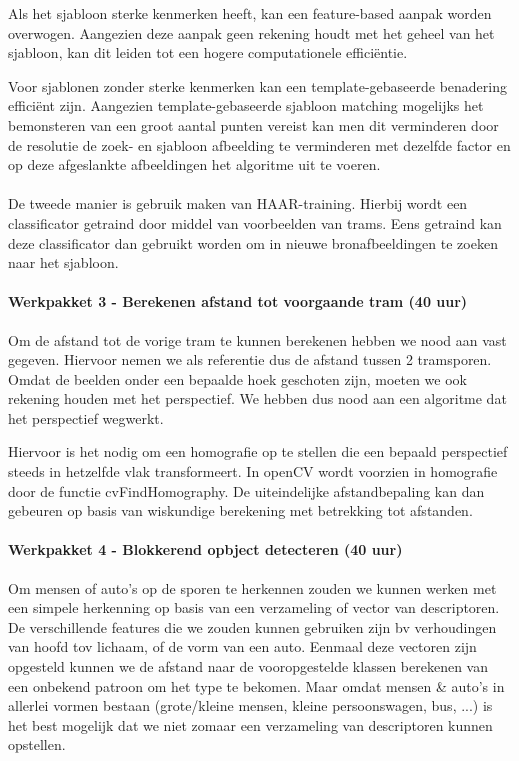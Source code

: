 \documentclass[]{book}
\begin{document}
Als het sjabloon sterke kenmerken heeft, kan een feature-based aanpak worden overwogen. Aangezien deze aanpak geen rekening houdt met het geheel van het sjabloon, kan dit leiden tot een hogere computationele efficiëntie.

Voor sjablonen zonder sterke kenmerken kan een template-gebaseerde benadering efficiënt zijn. Aangezien template-gebaseerde sjabloon matching mogelijks het bemonsteren van een groot aantal punten vereist kan men dit verminderen door de resolutie de zoek- en sjabloon afbeelding te verminderen met dezelfde factor en op deze afgeslankte afbeeldingen het algoritme uit te voeren.
\\\\
De tweede manier is gebruik maken van HAAR-training. Hierbij wordt een classificator getraind door middel van voorbeelden van trams. Eens getraind kan deze classificator dan gebruikt worden om in nieuwe bronafbeeldingen te zoeken naar het sjabloon.

\paragraph{Werkpakket 3 - Berekenen afstand tot voorgaande tram (40 uur)}

Om de afstand tot de vorige tram te kunnen berekenen hebben we nood aan vast gegeven. Hiervoor nemen we als referentie dus de afstand tussen 2 tramsporen. Omdat de beelden onder een bepaalde hoek geschoten zijn, moeten we ook rekening houden met het perspectief. We hebben dus nood aan een algoritme dat het perspectief wegwerkt.

Hiervoor is het nodig om een homografie op te stellen die een bepaald perspectief steeds in hetzelfde vlak transformeert. In openCV wordt voorzien in homografie door de functie cvFindHomography. De uiteindelijke afstandbepaling kan dan gebeuren op basis van wiskundige berekening met betrekking tot afstanden.

\paragraph{Werkpakket 4 - Blokkerend opbject detecteren (40 uur)}

Om mensen of auto's op de sporen te herkennen zouden we kunnen werken met een simpele herkenning op basis van een verzameling of vector van descriptoren. De verschillende features die we zouden kunnen gebruiken zijn bv verhoudingen van hoofd tov lichaam, of de vorm van een auto. Eenmaal deze vectoren zijn opgesteld kunnen we de afstand naar de vooropgestelde klassen berekenen van een onbekend patroon om het type te bekomen. Maar omdat mensen \& auto's in allerlei vormen bestaan (grote/kleine mensen, kleine persoonswagen, bus, ...) is het best mogelijk dat we niet zomaar een verzameling van descriptoren kunnen opstellen.
\end{document}
